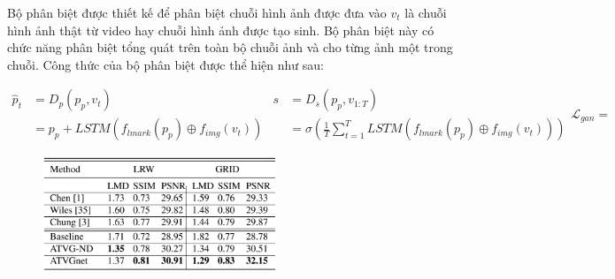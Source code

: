 Bộ phân biệt được thiết kế để phân biệt chuỗi hình ảnh được đưa vào $v_t$ là chuỗi hình ảnh thật từ video hay chuỗi hình ảnh được tạo sinh. Bộ phân biệt này có chức năng phân biệt tổng quát trên toàn bộ chuỗi ảnh và cho từng ảnh một trong chuỗi. Công thức của bộ phân biệt được thể hiện như sau:

\begin{subequations}
    \begin{equation}
        \begin{split}
            \hat{p}_t &= D_p(p_p, v_t) \\
            &= p_p + LSTM(f_{lmark}(p_p) \oplus f_{img}(v_t))
        \end{split}
        \label{eqn:chen2019_dis_dp}
    \end{equation}
    \begin{equation}
        \begin{split}
            s &= D_s(p_p, v_{1:T}) \\
            &= \sigma(\frac{1}{T} \sum^T_{t=1} LSTM(f_{lmark}(p_p) \oplus f_{img}(v_t)))
        \end{split}
        \label{eqn:chen2019_dis_ds}
    \end{equation}
    \begin{equation}
        \mathcal{L}_{gan} = \
        \label{eqn:chen2019_dis_gan}
    \end{equation}
\end{subequations}

\begin{figure}[H]
    \centering
    \includegraphics[width=7cm]{./content/images/chen2019_result.png}
    \caption{}
    \label{fig:chen2019_result}
\end{figure}
